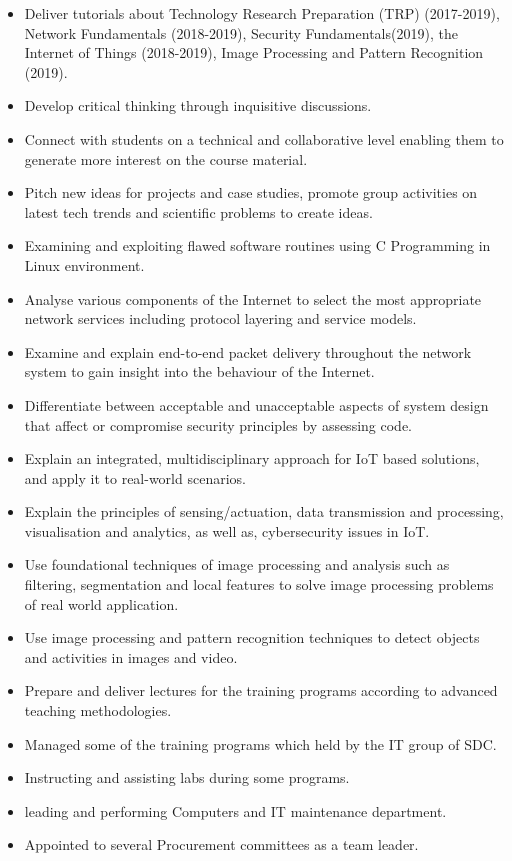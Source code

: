 \documentclass[10pt,a4paper,ragged2e]{altacv}
\begin{document}
\begin{itemize}
\item Deliver tutorials about Technology Research Preparation (TRP) (2017-2019), Network Fundamentals (2018-2019),
Security Fundamentals(2019), the Internet of Things (2018-2019), Image Processing and Pattern Recognition (2019).
\item Develop critical thinking through inquisitive discussions.
\item Connect with students on a technical and collaborative level enabling them to generate more interest on the course material.
\item Pitch new ideas for projects and case studies, promote group activities on latest tech trends and scientific problems to create ideas.
\item Examining and exploiting flawed software routines using C Programming in Linux environment.
\item Analyse various components of the Internet to select the most appropriate network services including protocol layering and service models.
\item Examine and explain end-to-end packet delivery throughout the network system to gain insight into the behaviour of the Internet.
\item Differentiate between acceptable and unacceptable aspects of system design that affect or compromise security principles by assessing code. 
\item Explain an integrated, multidisciplinary approach for IoT based solutions, and apply it to real-world scenarios. 
\item Explain the principles of sensing/actuation, data transmission and processing, visualisation and analytics, as well as, cybersecurity issues in IoT.
\item Use foundational techniques of image processing and analysis such as filtering, segmentation and local features to solve image processing problems of real world application.
\item Use image processing and pattern recognition techniques to detect objects and activities in images and video.

\end{itemize}


\divider

\begin{itemize}
\item Prepare and deliver lectures for the training programs according to advanced teaching methodologies.
\item Managed some of the training programs which held by the IT group of SDC.
\item Instructing and assisting labs during some programs.
\item leading and performing Computers and IT maintenance department.
\item Appointed to several Procurement committees as a team leader.
\end{itemize}
\end{document}
